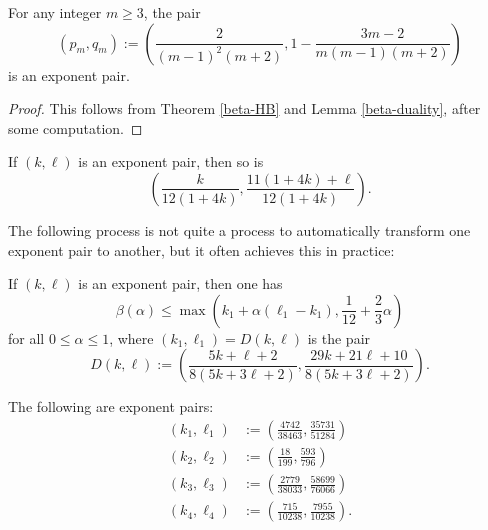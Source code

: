 \begin{theorem}\label{heath-brown_exp_pair_2017}\cite[Theorem 2]{heathbrown_new_2017}
For any integer $m \geq 3$, the pair
$$ (p_m,q_m) := \left(\frac{2}{(m-1)^2(m+2)}, 1 - \frac{3m-2}{m(m-1)(m+2)}\right)$$
is an exponent pair.
\end{theorem}

\literature
{}

\begin{proof} This follows from Theorem \ref{beta-HB} and Lemma \ref{beta-duality}, after some computation.
\end{proof}


\begin{theorem}\label{sargos_C}\cite[Theorem 5]{sargos_analog_2003}  If $(k,\ell)$ is an exponent pair, then so is
    $$ \left(\frac{k}{12(1+4k)}, \frac{11(1+4k)+\ell}{12(1+4k)}\right).$$
\end{theorem}

\literature
{}

The following process is not quite a process to automatically transform one exponent pair to another, but it often achieves this in practice:

\begin{theorem}\label{sargos_D}\cite[Theorem 7.1]{sargos_points_1995}  If $(k,\ell)$ is an exponent pair, then one has
    $$ \beta(\alpha) \leq \max\left( k_1 + \alpha(\ell_1-k_1), \frac{1}{12} + \frac{2}{3} \alpha\right)$$
    for all $0 \leq \alpha \leq 1$, where $(k_1,\ell_1) = D(k,\ell)$ is the pair
$$ D(k,\ell) := \left(\frac{5k+\ell+2}{8(5k+3\ell+2)}, \frac{29k+21\ell+10}{8(5k+3\ell+2)}\right).$$
\end{theorem}

\literature
{}


\begin{theorem}\label{trudgian_yang_eps}\cite[Lemma 1.1]{trudgian-yang}  The following are exponent pairs:
\begin{align*}
 (k_1,\ell_1) &:= \left(\frac{4742}{38463}, \frac{35731}{51284}\right)\\
 (k_2,\ell_2) &:= \left(\frac{18}{199}, \frac{593}{796}\right)\\
 (k_3,\ell_3) &:= \left(\frac{2779}{38033}, \frac{58699}{76066}\right)\\
 (k_4,\ell_4) &:= \left(\frac{715}{10238}, \frac{7955}{10238}\right).
\end{align*}
\end{theorem}

